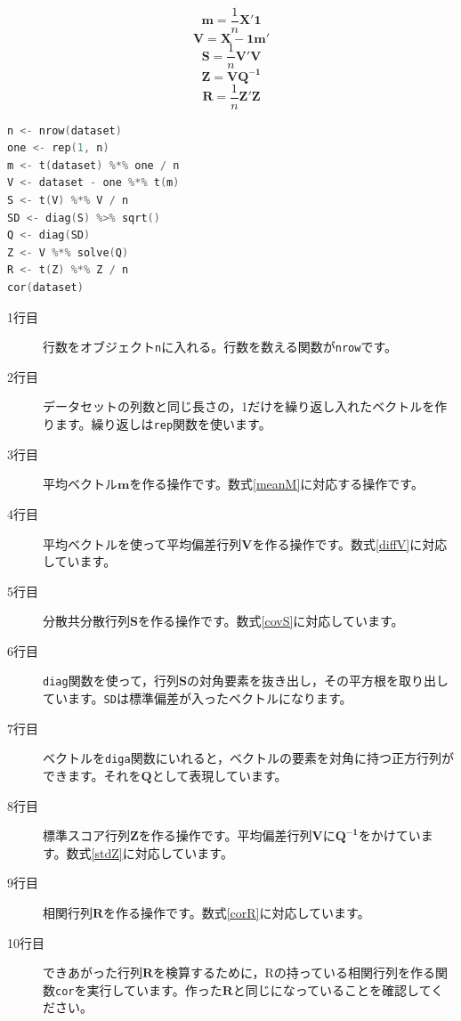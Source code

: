 \documentclass{ltjsbook}
\begin{document}
\begin{equation}
	\label{meanM} \bm{m} = \frac{1}{n}\bm{X'1}
\end{equation}
\begin{equation}
	\label{diffV} \bm{V} = \bm{X}-\bm{1m'}
\end{equation}
\begin{equation}
	\label{covS} \bm{S} = \frac{1}{n}\bm{V'V}
\end{equation}
\begin{equation}
	\label{stdZ} \bm{Z} = \bm{VQ^{-1}}
\end{equation}
\begin{equation}
	\label{corR} \bm{R} = \frac{1}{n}\bm{Z'Z}
\end{equation}

\begin{lstlisting}[language=c++,label={code:09_07},caption={データの行列演算}]
n <- nrow(dataset)
one <- rep(1, n)
m <- t(dataset) %*% one / n
V <- dataset - one %*% t(m)
S <- t(V) %*% V / n
SD <- diag(S) %>% sqrt()
Q <- diag(SD)
Z <- V %*% solve(Q)
R <- t(Z) %*% Z / n
cor(dataset)
\end{lstlisting}
\begin{description}
	\item[1行目] 行数をオブジェクト\texttt{n}に入れる。行数を数える関数が\texttt{nrow}です。
	\item[2行目] データセットの列数と同じ長さの，1だけを繰り返し入れたベクトルを作ります。繰り返しは\texttt{rep}関数を使います。
	\item[3行目] 平均ベクトル$\bm{m}$を作る操作です。数式\ref{meanM}に対応する操作です。
	\item[4行目] 平均ベクトルを使って平均偏差行列$\bm{V}$を作る操作です。数式\ref{diffV}に対応しています。
	\item[5行目] 分散共分散行列$\bm{S}$を作る操作です。数式\ref{covS}に対応しています。
	\item[6行目] \texttt{diag}関数を使って，行列$\bm{S}$の対角要素を抜き出し，その平方根を取り出しています。\texttt{SD}は標準偏差が入ったベクトルになります。
	\item[7行目] ベクトルを\texttt{diga}関数にいれると，ベクトルの要素を対角に持つ正方行列ができます。それを$\bm{Q}$として表現しています。
	\item[8行目] 標準スコア行列$\bm{Z}$を作る操作です。平均偏差行列$\bm{V}$に$\bm{Q^{-1}}$をかけています。数式\ref{stdZ}に対応しています。
	\item[9行目] 相関行列$\bm{R}$を作る操作です。数式\ref{corR}に対応しています。
	\item[10行目] できあがった行列$\bm{R}$を検算するために，Rの持っている相関行列を作る関数\texttt{cor}を実行しています。作った$\bm{R}$と同じになっていることを確認してください。
\end{description}
\end{document}
